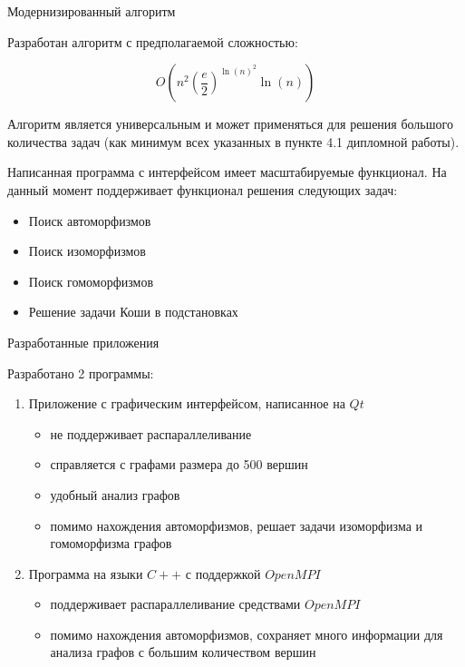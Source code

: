 \documentclass{beamer}
\begin{document}
\begin{frame}{Модернизированный алгоритм}

Разработан алгоритм с предполагаемой сложностью:

$$O(n^2(\frac{e}{2})^{\ln(n)^2} \ln(n))$$

Алгоритм является универсальным и может применяться для решения большого количества задач (как минимум всех указанных в пункте 4.1 дипломной работы).

Написанная программа с интерфейсом имеет масштабируемые функционал. На данный момент поддерживает функционал решения следующих задач:

\begin{itemize}
\item Поиск автоморфизмов
\item Поиск изоморфизмов
\item Поиск гомоморфизмов
\item Решение задачи Коши в подстановках
\end{itemize}

\end{frame}


\begin{frame}{Разработанные приложения}

Разработано 2 программы:

\begin{enumerate}
\item Приложение с графическим интерфейсом, написанное на $Qt$
\begin{itemize}
\item не поддерживает распараллеливание
\item справляется с графами размера до 500 вершин
\item удобный анализ графов
\item помимо нахождения автоморфизмов, решает задачи изоморфизма и гомоморфизма графов
\end{itemize} 
\item Программа на языки $C++$ с поддержкой $OpenMPI$
\begin{itemize}
\item поддерживает распараллеливание средствами $OpenMPI$
\item помимо нахождения автоморфизмов, сохраняет много информации для анализа графов с большим количеством вершин
\end{itemize} 
\end{enumerate} 

\end{frame}
\end{document}
